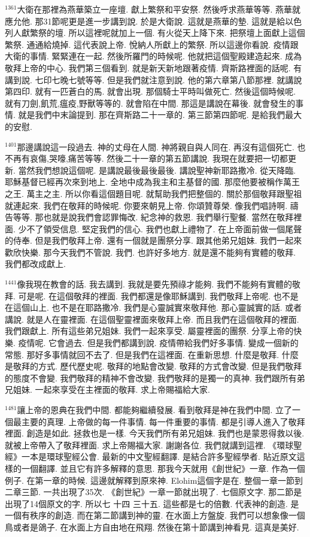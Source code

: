 \documentclass{book}
\begin{document}
$^{1361}$大衛在那裡為燕華築立一座壇.
獻上繁祭和平安祭.
然後呼求燕華等等.
燕華就應允他.
那31節呢更是進一步講到說.
於是大衛說.
這就是燕華的墊.
這就是給以色列人獻繁祭的壇.
所以這裡呢就加上一個.
有火從天上降下來.
把祭壇上面獻上這個繁祭.
通通給燒掉.
這代表說上帝.
悅納人所獻上的繁祭.
所以這邊你看說.
疫情跟大衛的事情.
緊緊連在一起.
然後所羅門的時候呢.
他就把這個聖殿建造起來.
成為敬拜上帝的中心.
我們第三個看到.
就是新天新地跟著疫情.
齊斯路裡面的話呢.
有講到說.
七印七晚七號等等.
但是我們就注意到說.
他的第六章第八節那裡.
就講說第四印.
就有一匹蒼白的馬.
就會出現.
那個騎士平時叫做死亡.
然後這個時候呢.
就有刀劍,飢荒,瘟疫,野獸等等的.
就會陷在中間.
那這是講說在幕後.
就會發生的事情.
就是我們中末論提到.
那在齊斯路二十一章的.
第三節第四節呢.
是給我們最大的安慰.

$^{1401}$那邊講說這一段過去.
神的丈母在人間.
神將親自與人同在.
再沒有這個死亡.
也不再有哀傷,哭嚎,痛苦等等.
然後二十一章的第五節講說.
我現在就要把一切都更新.
當然我們想說這個呢.
是講說最後最後最後.
講說聖神新耶路撒冷.
從天降臨.
耶穌基督已經再次來到地上.
全地中成為我主和主基督的國.
那麼他要被稱作萬王之王.
萬主之主.
所以你看這個題目呢.
就幫助我們把整個的.
關於那個敬拜跟聖祖就連起來.
我們在敬拜的時候呢.
你要來朝見上帝.
你頌贊尊榮.
像我們唱詩啊.
禱告等等.
那也就是說我們會認罪悔改.
紀念神的救恩.
我們舉行聖餐.
當然在敬拜裡面.
少不了領受信息.
堅定我們的信心.
我們也獻上禮物了.
在上帝面前做一個尾聲的侍奉.
但是我們敬拜上帝.
還有一個就是團祭分享.
跟其他弟兄姐妹.
我們一起來歡欣快樂.
那今天我們不管說.
我們.
也許好多地方.
就是還不能夠有實體的敬拜.
我們都改成獻上.

$^{1441}$像我現在教會的話.
我去講到.
我就是要先預祿才能夠.
我們不能夠有實體的敬拜.
可是呢.
在這個敬拜的裡面.
我們都還是像耶穌講到.
我們敬拜上帝呢.
也不是在這個山上.
也不是在耶路撒冷.
我們是心靈誠實來敬拜他.
那心靈誠實的話.
或者講說.
就是人在靈裡面.
在這個聖靈裡面來敬拜上帝.
而且我們在這個敬拜的裡面.
我們跟獻上.
所有這些弟兄姐妹.
我們一起來享受.
屬靈裡面的團祭.
分享上帝的快樂.
疫情呢.
它會過去.
但是我們都講到說.
疫情帶給我們好多事情.
變成一個新的常態.
那好多事情就回不去了.
但是我們在這裡面.
在重新思想.
什麼是敬拜.
什麼是敬拜的方式.
歷代歷史呢.
敬拜的地點會改變.
敬拜的方式會改變.
但是我們敬拜的態度不會變.
我們敬拜的精神不會改變.
我們敬拜的是獨一的真神.
我們跟所有弟兄姐妹.
一起來享受在主裡面的敬拜.
求上帝賜福給大家.

$^{1481}$讓上帝的恩典在我們中間.
都能夠繼續發展.
看到敬拜是神在我們中間.
立了一個最主要的真理.
上帝做的每一件事情.
每一件重要的事情.
都是引導人進入了敬拜裡面.
創造是如此.
拯救也是一樣.
今天我們所有弟兄姐妹.
我們也是蒙恩得救以後.
就被上帝帶入了敬拜裡面.
求上帝賜福大家.
謝謝各位.
我們就講到這裡.
《環球聖經》一本是環球聖經公會.
最新的中文聖經翻譯.
是結合許多聖經學者.
貼近原文這樣的一個翻譯.
並且它有許多解釋的意思.
那我今天就用《創世紀》一章.
作為一個例子.
在第一章的時候.
這邊就解釋到原來神.
Elohim這個字是在.
整個一章一節到二章三節.
一共出現了35次.
《創世紀》一章一節就出現了.
七個原文字.
那二節是出現了14個原文的字.
所以七 十四 三十五.
這些都是七的倍數.
代表神的創造.
是一個有秩序的創造.
而在第二節講到神的靈.
在水面上方盤旋.
我們可以想象像一個鳥或者是鴿子.
在水面上方自由地在飛翔.
然後在第十節講到神看見.
這真是美好.
\end{document}
